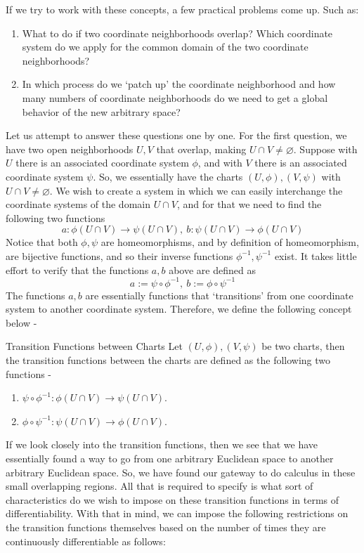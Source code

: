 \noindent If we try to work with these concepts, a few practical problems come up. Such as:
\begin{enumerate}
	\item What to do if two coordinate neighborhoods overlap? Which coordinate system do we apply for the common domain of the two coordinate neighborhoods?
	\item In which process do we `patch up' the coordinate neighborhood and how many numbers of coordinate neighborhoods do we need to get a global behavior of the new arbitrary space?
\end{enumerate}
Let us attempt to answer these questions one by one. For the first question, we have two open neighborhoods $U,V$ that overlap, making $U\cap V\neq\varnothing$. Suppose with $U$ there is an associated coordinate system $\phi$, and with $V$ there is an associated coordinate system $\psi$. So, we essentially have the charts $(U,\phi),(V,\psi)$ with $U\cap V\neq\varnothing$. We wish to create a system in which we can easily interchange the coordinate systems of the domain $U\cap V$, and for that we need to find the following two functions $$ a:\phi(U\cap V)\to\psi(U\cap V),\ b:\psi(U\cap V)\to\phi(U\cap V) $$ Notice that both $\phi,\psi$ are homeomorphisms, and by definition of homeomorphism, are bijective functions, and so their inverse functions $\phi^{-1},\psi^{-1}$ exist. It takes little effort to verify that the functions $a,b$ above are defined as $$a:=\psi\circ\phi^{-1},\ b:=\phi\circ\psi^{-1}$$ The functions $a,b$ are essentially functions that `transitions' from one coordinate system to another coordinate system. Therefore, we define the following concept below -
\begin{Definition}{Transition Functions between Charts}\label{transition_functions}
	Let $(U,\phi),(V,\psi)$ be two charts, then the transition functions between the charts are defined as the following two functions -
	\begin{enumerate}
		\item $\psi\circ\phi^{-1}:\phi(U\cap V)\to\psi(U\cap V)$.
		\item $\phi\circ\psi^{-1}:\psi(U\cap V)\to\phi(U\cap V)$.
	\end{enumerate}
\end{Definition}
\noindent If we look closely into the transition functions, then we see that we have essentially found a way to go from one arbitrary Euclidean space to another arbitrary Euclidean space. So, we have found our gateway to do calculus in these small overlapping regions. All that is required to specify is what sort of characteristics do we wish to impose on these transition functions in terms of differentiability. With that in mind, we can impose the following restrictions on the transition functions themselves based on the number of times they are continuously differentiable as follows:
